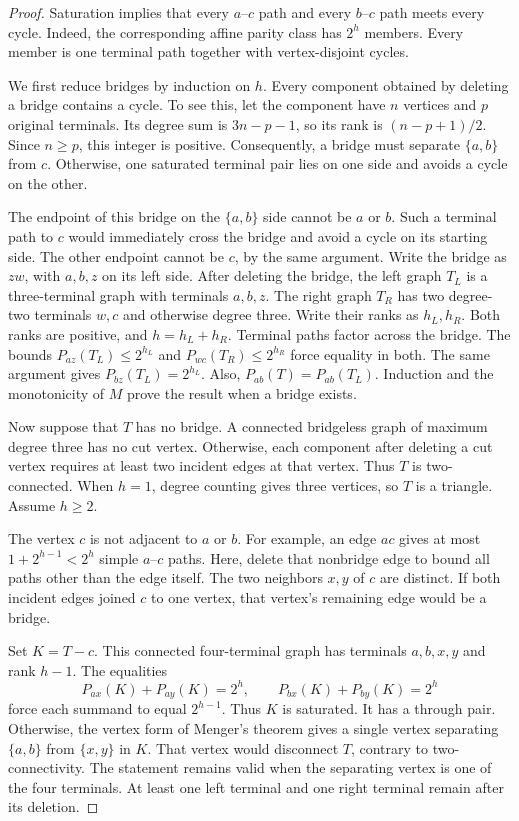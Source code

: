 \begin{proof}
Saturation implies that every $a$--$c$ path and every $b$--$c$ path meets every cycle.
Indeed, the corresponding affine parity class has $2^h$ members.
Every member is one terminal path together with vertex-disjoint cycles.

We first reduce bridges by induction on $h$.
Every component obtained by deleting a bridge contains a cycle.
To see this, let the component have $n$ vertices and $p$ original terminals.
Its degree sum is $3n-p-1$, so its rank is $(n-p+1)/2$.
Since $n\ge p$, this integer is positive.
Consequently, a bridge must separate $\{a,b\}$ from $c$.
Otherwise, one saturated terminal pair lies on one side and avoids a cycle on the other.

The endpoint of this bridge on the $\{a,b\}$ side cannot be $a$ or $b$.
Such a terminal path to $c$ would immediately cross the bridge and avoid a cycle on its starting side.
The other endpoint cannot be $c$, by the same argument.
Write the bridge as $zw$, with $a,b,z$ on its left side.
After deleting the bridge, the left graph $T_L$ is a three-terminal graph with terminals $a,b,z$.
The right graph $T_R$ has two degree-two terminals $w,c$ and otherwise degree three.
Write their ranks as $h_L,h_R$.
Both ranks are positive, and $h=h_L+h_R$.
Terminal paths factor across the bridge.
The bounds $P_{az}(T_L)\le2^{h_L}$ and $P_{wc}(T_R)\le2^{h_R}$ force equality in both.
The same argument gives $P_{bz}(T_L)=2^{h_L}$.
Also, $P_{ab}(T)=P_{ab}(T_L)$.
Induction and the monotonicity of $M$ prove the result when a bridge exists.

Now suppose that $T$ has no bridge.
A connected bridgeless graph of maximum degree three has no cut vertex.
Otherwise, each component after deleting a cut vertex requires at least two incident edges at that vertex.
Thus $T$ is two-connected.
When $h=1$, degree counting gives three vertices, so $T$ is a triangle.
Assume $h\ge2$.

The vertex $c$ is not adjacent to $a$ or $b$.
For example, an edge $ac$ gives at most
$1+2^{h-1}<2^h$ simple $a$--$c$ paths.
Here, delete that nonbridge edge to bound all paths other than the edge itself.
The two neighbors $x,y$ of $c$ are distinct.
If both incident edges joined $c$ to one vertex, that vertex's remaining edge would be a bridge.

Set $K=T-c$.
This connected four-terminal graph has terminals $a,b,x,y$ and rank $h-1$.
The equalities
\[
 P_{ax}(K)+P_{ay}(K)=2^h,
 \qquad
 P_{bx}(K)+P_{by}(K)=2^h
\]
force each summand to equal $2^{h-1}$.
Thus $K$ is saturated.
It has a through pair.
Otherwise, the vertex form of Menger's theorem gives a single vertex separating
$\{a,b\}$ from $\{x,y\}$ in $K$.
That vertex would disconnect $T$, contrary to two-connectivity.
The statement remains valid when the separating vertex is one of the four terminals.
At least one left terminal and one right terminal remain after its deletion.


\end{proof}

